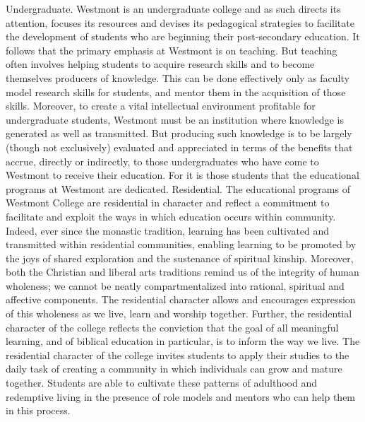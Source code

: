 \documentclass[letterpaper, 11pt]{article}
\begin{document}
   Undergraduate.  Westmont is an undergraduate college and as such directs its attention, focuses its resources and devises its pedagogical strategies to facilitate the development of students who are beginning their post-secondary education.  It follows that the primary emphasis at Westmont is on teaching.  But teaching often involves helping students to acquire research skills and to become themselves producers of knowledge.  This can be done effectively only as faculty model research skills for students, and mentor them in the acquisition of those skills.  Moreover, to create a vital intellectual environment profitable for undergraduate students, Westmont must be an institution where knowledge is generated as well as transmitted.  But producing such knowledge is to be largely (though not exclusively) evaluated and appreciated in terms of the benefits that accrue, directly or indirectly, to those undergraduates who have come to Westmont to receive their education. For it is those students that the educational programs at Westmont are dedicated.
   Residential.  The educational programs of Westmont College are residential in character and reflect a commitment to facilitate and exploit the ways in which education occurs within community.  Indeed, ever since the monastic tradition, learning has been cultivated and transmitted within residential communities, enabling learning to be promoted by the joys of shared exploration and the sustenance of spiritual kinship.  Moreover, both the Christian and liberal arts traditions remind us of the integrity of human wholeness; we cannot be neatly compartmentalized into rational, spiritual and affective components.  The residential character allows and encourages expression of this wholeness as we live, learn and worship together.  Further, the residential character of the college reflects the conviction that the goal of all meaningful learning, and of biblical education in particular, is to inform the way we live.  The residential character of the college invites students to apply their studies to the daily task of creating a community in which individuals can grow and mature together.  Students are able to cultivate these patterns of adulthood and redemptive living in the presence of role models and mentors who can help them in this process.
\end{document}
